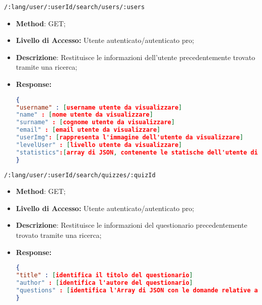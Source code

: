 	\item \texttt{/:lang/user/:userId/search/users/:users}
	 \begin{itemize}
	 	\item \textbf{Method}: GET;
	 	\item \textbf{Livello di Accesso:} Utente autenticato/autenticato pro;
	 	\item \textbf{Descrizione}: Restituisce le informazioni dell'utente precedentemente trovato tramite una ricerca;
	 	\item \textbf{Response:} 
\begin{lstlisting}[language=json,firstnumber=1]
{
"username" : [username utente da visualizzare]
"name" : [nome utente da visualizzare]
"surname" : [cognome utente da visualizzare]
"email" : [email utente da visualizzare]
"userImg": [rappresenta l'immagine dell'utente da visualizzare]
"levelUser" : [livello utente da visualizzare]
"statistics":[array di JSON, contenente le statische dell'utente di ogni argomento]
}
\end{lstlisting}
	 \end{itemize}
	 
	 
	\item \texttt{/:lang/user/:userId/search/quizzes/:quizId}
	\begin{itemize}
		\item \textbf{Method}: GET;
		\item \textbf{Livello di Accesso:} Utente autenticato/autenticato pro;
		\item \textbf{Descrizione}: Restituisce le informazioni del questionario precedentemente trovato tramite una ricerca;
		\item \textbf{Response:} 
\begin{lstlisting}[language=json,firstnumber=1]
{
"title" : [identifica il titolo del questionario]
"author" : [identifica l'autore del questionario]
"questions" : [identifica l'Array di JSON con le domande relative al questionario]
}
\end{lstlisting}
	\end{itemize}